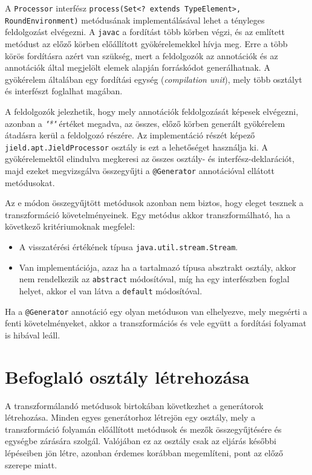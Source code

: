 A \texttt{Processor} interfész \texttt{process(Set<? extends TypeElement>, RoundEnvironment)} metódusának implementálásával lehet a tényleges feldolgozást elvégezni. A \texttt{javac} a fordítást több körben végzi, és az említett metódust az előző körben előállított gyökérelemekkel hívja meg. Erre a több körös fordításra azért van szükség, mert a feldolgozók az annotációk és az annotációk által megjelölt elemek alapján forráskódot generálhatnak. A gyökérelem általában egy fordítási egység (\textit{compilation unit}), mely több osztályt és interfészt foglalhat magában.

A feldolgozók jelezhetik, hogy mely annotációk feldolgozását képesek elvégezni, azonban a \textit{"*"} értéket megadva, az összes, előző körben generált gyökérelem átadásra kerül a feldolgozó részére. Az implementáció részét képező \texttt{jield.apt.JieldProcessor} osztály is ezt a lehetőséget használja ki. A gyökérelemektől elindulva megkeresi az összes osztály- és interfész-deklarációt, majd ezeket megvizsgálva összegyűjti a \texttt{@Generator} annotációval ellátott metódusokat.

Az e módon összegyűjtött metódusok azonban nem biztos, hogy eleget tesznek a transzformáció követelményeinek. Egy metódus akkor transzformálható, ha a következő kritériumoknak megfelel:

\begin{itemize}
    \item A visszatérési értékének típusa \texttt{java.util.stream.Stream}.
    \item Van implementációja, azaz ha a tartalmazó típusa absztrakt osztály, akkor nem rendelkezik az \texttt{abstract} módosítóval, míg ha egy interfészben foglal helyet, akkor el van látva a \texttt{default} módosítóval.
\end{itemize}

Ha a \texttt{@Generator} annotáció egy olyan metóduson van elhelyezve, mely megsérti a fenti követelményeket, akkor a transzformációs és vele együtt a fordítási folyamat is hibával leáll.

\section{Befoglaló osztály létrehozása}

A transzformálandó metódusok birtokában következhet a generátorok létrehozása. Minden egyes generátorhoz létrejön egy osztály, mely a transzformáció folyamán előállított metódusok és mezők összegyűjtésére és egységbe zárására szolgál. Valójában ez az osztály csak az eljárás későbbi lépéseiben jön létre, azonban érdemes korábban megemlíteni, pont az előző szerepe miatt.

